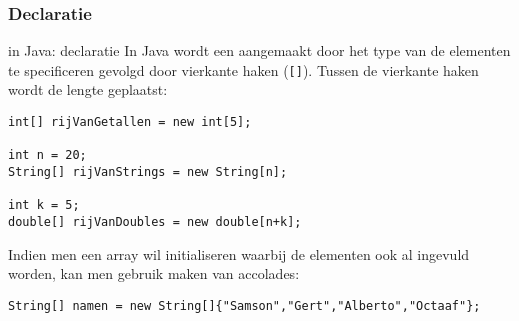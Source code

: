 \subsubsection{Declaratie}
\begin{frame}[fragile]{\dsarray{} in Java: declaratie}
In Java wordt een \dsarray{} aangemaakt door het type van de elementen te specificeren gevolgd door vierkante haken (\texttt{[]}). Tussen de vierkante haken wordt de lengte geplaatst:
\begin{example}
\begin{lstlisting}
int[] rijVanGetallen = new int[5];

int n = 20;
String[] rijVanStrings = new String[n];

int k = 5;
double[] rijVanDoubles = new double[n+k];
\end{lstlisting}
\end{example}
\begin{hint}
Indien men een array wil initialiseren waarbij de elementen ook al ingevuld worden, kan men gebruik maken van accolades:
\begin{lstlisting}
String[] namen = new String[]{"Samson","Gert","Alberto","Octaaf"};
\end{lstlisting}
\end{hint}
\end{frame}
